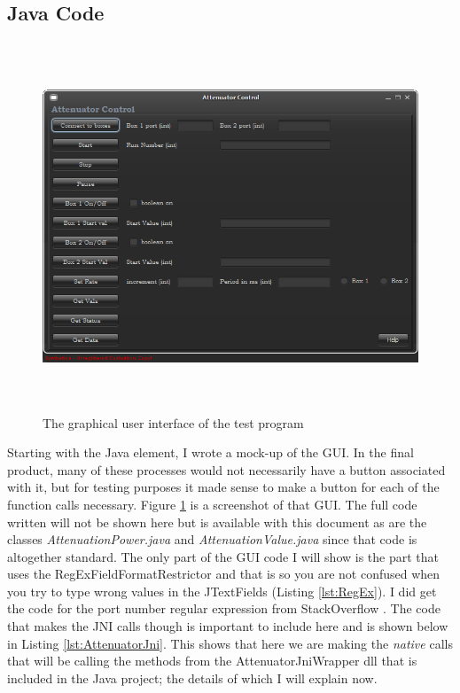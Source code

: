 \documentclass [a4paper,12pt,oneside,final,titlepage]{article}
\begin{document}
\subsection{Java Code}
	\begin{figure}
		\centering
		\includegraphics[height=110mm]{gui}
		\caption{The graphical user interface of the test program}
		\label{fig:gui}
	\end{figure}

	Starting with the Java element, I wrote a mock-up of the GUI. In the final product, many of these processes would not necessarily have a button associated with it, but for testing purposes it made sense to make a button for each of the function calls necessary. Figure \ref{fig:gui} is a screenshot of that GUI. The full code written will not be shown here but is available with this document as are the classes \emph{AttenuationPower.java} and \emph{AttenuationValue.java} since that code is altogether standard. The only part of the GUI code I will show is the part that uses the RegExFieldFormatRestrictor and that is so you are not confused when you try to type wrong values in the JTextFields (Listing \ref{lst:RegEx}). I did get the code for the port number regular expression from StackOverflow \cite{regex}. The code that makes the JNI calls though is important to include here and is shown below in Listing \ref{lst:AttenuatorJni}. This shows that here we are making the \emph{native} calls that will be calling the methods from the AttenuatorJniWrapper dll that is included in the Java project; the details of which I will explain now. 
\end{document}
